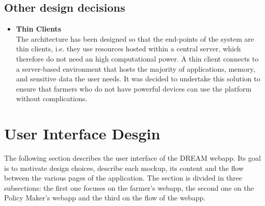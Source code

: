 \documentclass[10pt]{article} %
\begin{document}
\subsection{Other design decisions}
\begin{itemize}
    \item \textbf{Thin Clients}\\The architecture has been designed so that the end-points of the system 
    are thin clients, i.e. they use resources hosted within a central server, which therefore do not need an high 
    computational power. A thin client connects to a server-based environment that hosts the majority of 
    applications, memory, and sensitive data the user needs. It was decided to undertake this solution 
    to ensure that farmers who do not have powerful devices can use the platform without complications.
\end{itemize}
\newpage
\section{User Interface Desgin} 
The following section describes the user interface of the DREAM webapp. Its goal is to motivate design choices, 
describe each mockup, its content and the flow between the various pages of the application.
The section is divided in three subsections: the first one focuses on the farmer's webapp, the second one on the Policy Maker's webapp
and the third on the flow of the webapp.\\
\end{document}
